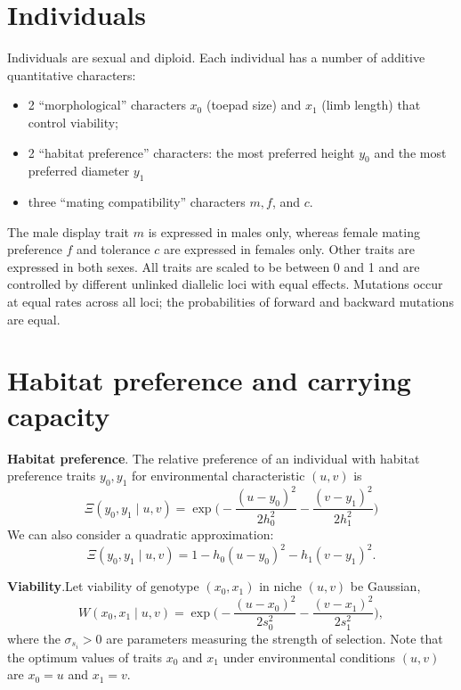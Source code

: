 \documentclass{article}
\begin{document}
\section{Individuals}

Individuals are sexual and diploid. Each individual has a number of additive quantitative characters:
\begin{itemize}
  \item 2 ``morphological'' characters $x_0$ (toepad size) and $x_1$
    (limb length) that control viability;
  \item 2 ``habitat preference'' characters: the most preferred height
    $y_0$ and the most preferred diameter $y_1$
  \item three ``mating compatibility'' characters $m, f$, and $c$.
\end{itemize}

The male display trait $m$ is expressed in males only, whereas female mating preference $f$ and tolerance $c$ are expressed in females only.
Other traits are expressed in both sexes.
All traits are scaled to be between 0 and 1 and are controlled by different unlinked diallelic loci with equal effects.
Mutations occur at equal rates across all loci;
the probabilities of forward and backward mutations are equal.


\newpage
\section{Habitat preference and carrying capacity}

{\bf Habitat preference}.\quad
The relative preference of an individual with habitat preference traits $y_0,y_1$ for environmental characteristic $(u,v)$ is
\begin{equation}
  \Xi(y_0,y_1\mid u,v) = \exp\big(-\frac{(u-y_0)^2}{2h_0^2} -\frac{(v-y_1)^2}{2h_1^2}\big)
\end{equation}
We can also consider a quadratic approximation:
\begin{equation} \label{quad}
  \Xi(y_0,y_1\mid u,v) = 1-h_0(u-y_0)^2-h_1(v-y_1)^2.
\end{equation}

{\bf Viability}.\quad Let viability of genotype $(x_0,x_1)$ in niche $(u,v)$ be Gaussian,
\begin{equation}
  W(x_0,x_1 \mid u,v) = \exp\big(-\frac{(u-x_0)^2}{2s_0^2} -\frac{(v-x_1)^2}{2s_1^2}\big),
\end{equation}
where the $\sigma_{s_i}>0$ are parameters measuring the strength of selection.
Note that the optimum values of traits $x_0$ and $x_1$ under environmental conditions $(u,v)$ are $x_0 = u$ and $x_1 = v$.\\
\end{document}

